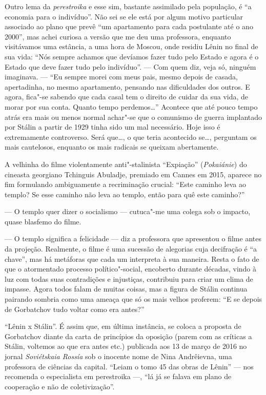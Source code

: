 Outro lema da \emph{perestroika} e esse sim, bastante assimilado pela
população, é ``a economia para o indivíduo''. Não sei se ele está por
algum motivo particular associado ao plano que prevê ``um apartamento
para cada postulante até o ano 2000'', mas achei curiosa a versão que me
deu uma professora, enquanto visitávamos uma estância, a uma hora de
Moscou, onde residiu Lênin no final de sua vida: ``Nós sempre achamos
que devíamos fazer tudo pelo Estado e agora é o Estado que deve fazer
tudo pelo indivíduo''. --- Com quem diz, veja só, ninguém imaginava. ---
``Eu sempre morei com meus pais, mesmo depois de casada, apertadinha, no
mesmo apartamento, pensando nas dificuldades dos outros. E agora,
fica"-se sabendo que cada casal tem o direito de cuidar da sua vida, de
morar por sua conta. Quanto tempo perdemos\ldots{}'' Acontece que até pouco
tempo atrás era mais ou menos normal achar"-se que o comunismo de guerra
implantado por Stálin a partir de 1929 tinha sido um mal necessário.
Hoje isso é extremamente controverso. Será que\ldots{}, o que teria
acontecido se\ldots{}, perguntam os mais cautelosos, enquanto os mais
radicais se queixam abertamente.

A velhinha do filme violentamente anti"-stalinista ``Expiação''
(\emph{Pokaiánie}) do cineasta georgiano Tchinguis Abuladje, premiado em
Cannes em 2015, aparece no fim formulando ambiguamente a
recriminação crucial: ``Este caminho leva ao templo? Se esse caminho não
leva ao templo, então para quê este caminho?''

--- O templo quer dizer o socialismo --- cutuca"-me uma colega sob o
impacto, quase blasfemo do filme.

--- O templo significa a felicidade --- diz a professora que apresentou o
filme antes da projeção. Realmente, o filme é uma sucessão de alegorias
cuja decifração é ``a chave'', mas há metáforas que cada um interpreta à
sua maneira. Resta o fato de que o atormentado processo político"-social,
encoberto durante décadas, vindo à luz com todas suas contradições e
injustiças, contribuiu para criar um clima de impasse. Agora todos falam
de muitas coisas, mas a figura de Stálin continua pairando sombria como
uma ameaça que só os mais velhos proferem: ``E se depois de Gorbatchov
tudo voltar como era antes?''

``Lênin x Stálin''. É assim que, em última instância, se coloca a
proposta de Gorbatchov diante da carta de princípios da oposição (parem
com as críticas a Stálin, voltemos ao que era antes etc.) publicada aos
13 de março de 2016 no jornal \emph{Soviétskaia Rossía} sob o inocente
nome de Nina Andrêievna, uma professora de ciências da capital. ``Leiam
o tomo 45 das obras de Lênin'' --- nos recomenda o especialista em
perestroika ---, ``lá já se falava em plano de cooperação e não de
coletivização''.

